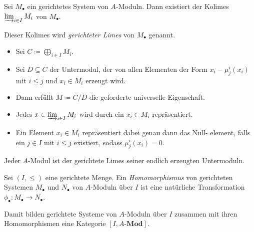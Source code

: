 \documentclass{cheat-sheet}
\newcommand{\Mod}{\mathbf{Mod}} %
\newcommand{\LMod}[1]{{#1}\text{-}\Mod} %
\begin{document}
\begin{prop}
  Sei $M_\bullet$ ein gerichtetes System von $A$-Moduln.
  Dann existiert der Kolimes $\varinjlim_{i \in I} M_i$ von $M_\bullet$.
\end{prop}

\begin{defn}
  Dieser Kolimes wird \emph{gerichteter Limes} von $M_\bullet$ genannt.
\end{defn}

\begin{konstr}
  \begin{itemize}
    \item Sei $C \coloneqq \bigoplus_{i \in I} M_i$.
    \item Sei $D \subseteq C$ der Untermodul, der von allen Elementen der Form $x_i - \mu^i_j(x_i)$ mit $i \leq j$ und $x_i \in M_i$ erzeugt wird.
    \item Dann erfüllt $M \coloneqq C/D$ die geforderte universelle Eigenschaft.
  \end{itemize}
\end{konstr}


\begin{bem}
  \begin{itemize}
    \item Jedes $x \in \varinjlim_{i \in I} M_i$ wird durch ein $x_i \in M_i$ repräsentiert.
    \item Ein Element $x_i \in M_i$ repräsentiert dabei genau dann das Null- element, falls ein $j \in I$ mit $i \leq j$ existiert, sodass $\mu^i_j(x_i) = 0$.
  \end{itemize}
\end{bem}

\begin{lem}
  Jeder $A$-Modul ist der gerichtete Limes seiner endlich erzeugten Untermoduln.
\end{lem}


\begin{defn}
  Sei $(I, \leq)$ eine gerichtete Menge.
  Ein \textit{Homomorphismus} von gerichteten Systemen $M_\bullet$ und $N_\bullet$ von $A$-Moduln über $I$ ist eine natürliche Transformation $\phi_\bullet : M_\bullet \to N_\bullet$.
\end{defn}

\begin{bem}
  Damit bilden gerichtete Systeme von $A$-Moduln über $I$ zusammen mit ihren Homomorphismen eine Kategorie $[I, \LMod{A}]$.
\end{bem}
\end{document}
